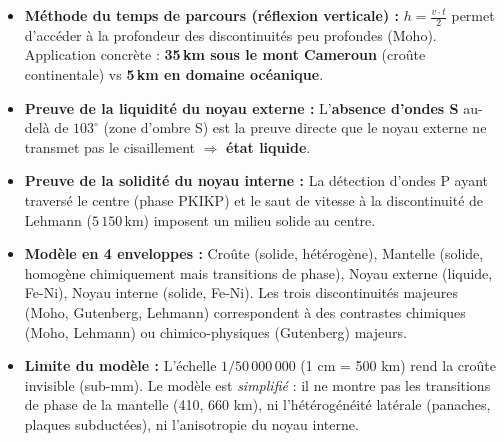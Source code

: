\documentclass[11pt]{article}
\begin{document}
\begin{aretenir}
\begin{itemize}
    \item \textbf{Méthode du temps de parcours (réflexion verticale) :} $h = \frac{v \cdot t}{2}$ permet d'accéder à la profondeur des discontinuités peu profondes (Moho). Application concrète : \textbf{35\,km sous le mont Cameroun} (croûte continentale) vs \textbf{5\,km en domaine océanique}.
    \item \textbf{Preuve de la liquidité du noyau externe :} L'\textbf{absence d'ondes S} au-delà de $103^\circ$ (zone d'ombre S) est la preuve directe que le noyau externe ne transmet pas le cisaillement $\Rightarrow$ \textbf{état liquide}.
    \item \textbf{Preuve de la solidité du noyau interne :} La détection d'ondes P ayant traversé le centre (phase PKIKP) et le saut de vitesse à la discontinuité de Lehmann ($5\,150\,\text{km}$) imposent un milieu solide au centre.
    \item \textbf{Modèle en 4 enveloppes :} Croûte (solide, hétérogène), Mantelle (solide, homogène chimiquement mais transitions de phase), Noyau externe (liquide, Fe-Ni), Noyau interne (solide, Fe-Ni). Les trois discontinuités majeures (Moho, Gutenberg, Lehmann) correspondent à des contrastes chimiques (Moho, Lehmann) ou chimico-physiques (Gutenberg) majeurs.
    \item \textbf{Limite du modèle :} L'échelle $1/50\,000\,000$ (1 cm = 500 km) rend la croûte invisible (sub-mm). Le modèle est \emph{simplifié} : il ne montre pas les transitions de phase de la mantelle (410, 660 km), ni l'hétérogénéité latérale (panaches, plaques subductées), ni l'anisotropie du noyau interne.
\end{itemize}
\end{aretenir}
\end{document}
